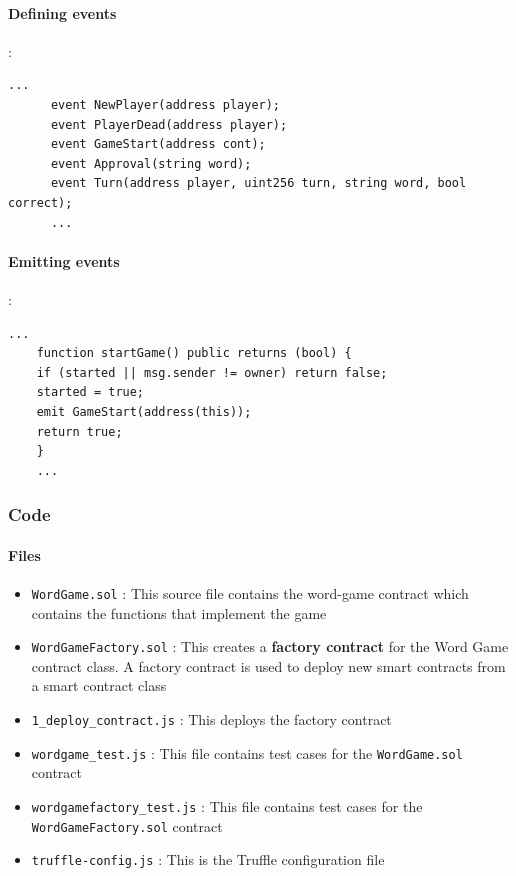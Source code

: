 \documentclass{article}
\begin{document}
\paragraph{Defining events}:
\begin{lstlisting}[language=Solidity]
      ...
      event NewPlayer(address player);
      event PlayerDead(address player);
      event GameStart(address cont);
      event Approval(string word);
      event Turn(address player, uint256 turn, string word, bool correct);
      ...
\end{lstlisting}

\paragraph{Emitting events}:
  \begin{lstlisting}[language=Solidity]
    ...
    function startGame() public returns (bool) {
    if (started || msg.sender != owner) return false;
    started = true;
    emit GameStart(address(this));
    return true;
    }
    ...
\end{lstlisting}







\subsubsection{Code}


\paragraph{Files}

\begin{itemize}
    \item \verb|WordGame.sol| : This source file contains the word-game contract which contains the functions that implement the game 
    \item \verb|WordGameFactory.sol| : This creates a \textbf{factory contract} for the Word Game contract class. A factory contract is used to deploy new smart contracts from a smart contract class
    \item \verb|1_deploy_contract.js| : This deploys the factory contract
    \item \verb|wordgame_test.js| : This file contains test cases for the \verb|WordGame.sol| contract
    \item \verb|wordgamefactory_test.js| : This file contains test cases for the \verb|WordGameFactory.sol| contract
    \item \verb|truffle-config.js| : This is the Truffle configuration file
\end{itemize}
\end{document}
